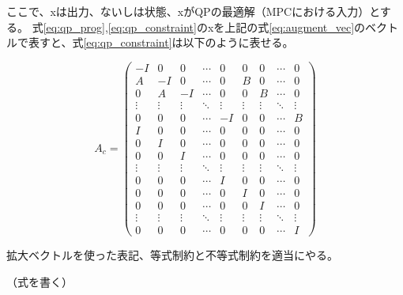 ここで、xは出力、ないしは状態、xがQPの最適解（MPCにおける入力）とする。
式\eqref{eq:qp_prog},\eqref{eq:qp_constraint}のxを上記の式\eqref{eq:augment_vec}のベクトルで表すと、式\eqref{eq:qp_constraint}は以下のように表せる。

\begin{equation}
  A_{c} =
  \left(
  \begin{array}{ccccc|cccc}
      -I & 0 & 0 & \cdots & 0 & 0 & 0 & \cdots & 0 \\ A & -I & 0 & \cdots & 0 & B & 0 & \cdots & 0 \\ 0 & A & -I & \cdots & 0 & 0 & B & \cdots & 0\\ \vdots & \vdots & \vdots & \ddots & \vdots & \vdots & \vdots & \ddots & \vdots \\ 0 & 0 & 0 & \cdots & -I & 0 & 0 & \cdots & B\\ \hline I & 0 & 0 & \cdots & 0 & 0 & 0 & \cdots & 0\\ 0 & I & 0 & \cdots & 0 & 0 & 0 & \cdots & 0\\ 0 & 0 & I & \cdots & 0 & 0 & 0 & \cdots & 0\\ \vdots & \vdots & \vdots & \ddots & \vdots & \vdots & \vdots & \ddots & \vdots \\ 0 & 0 & 0 & \cdots & I & 0 & 0 & \cdots & 0\\ 0 & 0 & 0 & \cdots & 0 & I & 0 & \cdots & 0\\ 0 & 0 & 0 & \cdots & 0 & 0 & I & \cdots & 0\\ \vdots & \vdots & \vdots & \ddots & \vdots & \vdots & \vdots & \ddots & \vdots \\ 0 & 0 & 0 & \cdots & 0 & 0 & 0 & \cdots & I
    \end{array}
  \right)
  \label{eq:mpc_constraint_matrix}
\end{equation}



拡大ベクトルを使った表記、等式制約と不等式制約を適当にやる。

（式を書く）

